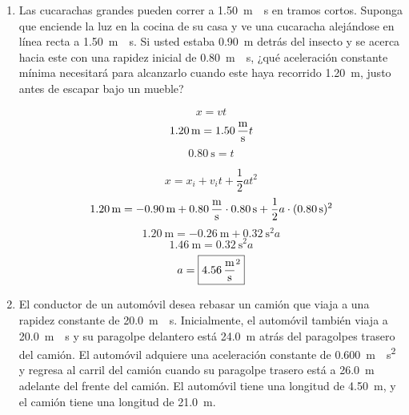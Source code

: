 \documentclass[Física - Práctica.root.tex]{subfiles}
\begin{document}
\begin{enumerate}
  \item Las cucarachas grandes pueden correr a \SI{1,50}{\meter\over\second} en tramos cortos. Suponga que enciende la luz en la cocina de su casa y ve una cucaracha alejándose en línea recta a \SI{1,50}{\meter\over\second}. Si usted estaba \SI{0,90}{\meter} detrás del insecto y se acerca hacia este con una rapidez inicial de \SI{0,80}{\meter\over\second}, ¿qué aceleración constante mínima necesitará para alcanzarlo cuando este haya recorrido \SI{1,20}{\meter}, justo antes de escapar bajo un mueble?

        \[x=vt\]
        \[\SI{1,20}{\meter}=\SI{1,50}{\meter\over\second}t\]
        \[\SI{0,80}{\second}=t\]

        \[x=x_i+v_it+\frac{1}{2}at^2\]
        \[\SI{1,20}{\meter}=\SI{-0,90}{\meter}+\SI{0,80}{\meter\over\second}\cdot\SI{0,80}{\second}+\frac{1}{2}a\cdot(\SI{0,80}{\second})^2\]
        \[\SI{1,20}{\meter}=\SI{-0,26}{\meter}+\SI{0,32}{\second\squared}a\]
        \[\SI{1,46}{\meter}=\SI{0,32}{\second\squared}a\]
        \[a=\boxed{\SI{4,56}{\meter\over\second\squared}}\]

  \item El conductor de un automóvil desea rebasar un camión que viaja a una rapidez constante de \SI{20,0}{\meter\over\second}. Inicialmente, el automóvil también viaja a \SI{20,0}{\meter\over\second} y su paragolpe delantero está \SI{24,0}{\meter} atrás del paragolpes trasero del camión. El automóvil adquiere una aceleración constante de \SI{0,600}{\meter\over\second\squared} y regresa al carril del camión cuando su paragolpe trasero está a \SI{26,0}{\meter} adelante del frente del camión. El automóvil tiene una longitud de \SI{4,50}{\meter}, y el camión tiene una longitud de \SI{21,0}{\meter}.

        \begin{center}
        \end{center}


\end{enumerate}
\end{document}
